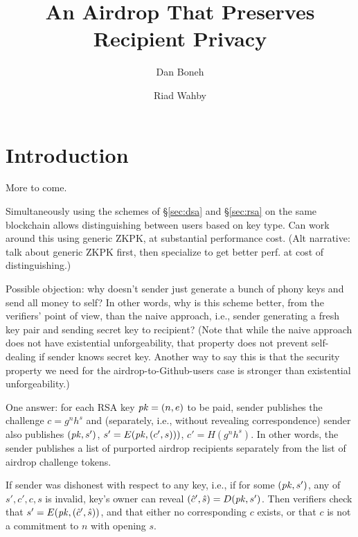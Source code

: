 \documentclass[11pt]{article}
\begin{document}
\title{An Airdrop That Preserves Recipient Privacy}
\author{Dan Boneh \and Riad Wahby}

\maketitle

\begin{abstract}
\end{abstract}

\section{Introduction}

More to come.

Simultaneously using the schemes of \S\ref{sec:dsa} and \S\ref{sec:rsa}
    on the same blockchain allows distinguishing between users based on
    key type.
Can work around this using generic ZKPK, at substantial performance cost.
(Alt narrative: talk about generic ZKPK first, then specialize to get better
    perf. at cost of distinguishing.)

Possible objection: why doesn't sender just generate a bunch of phony keys
    and send all money to self?
In other words, why is this scheme better, from the verifiers' point of view,
    than the naive approach, i.e., sender generating a fresh key pair and
    sending secret key to recipient?
(Note that while the naive approach does not have existential unforgeability,
    that property does not prevent self-dealing if sender knows secret key.
Another way to say this is that the security property we need for the
    airdrop-to-Github-users case is stronger than existential unforgeability.)

One answer: for each RSA key $\mathit{pk} = (n, e)$ to be paid, sender publishes
    the challenge $c = g^nh^s$ and (separately, i.e., without revealing
    correspondence) sender also publishes
$(\mathit{pk}, s')$, $s' = E(\mathit{pk}, (c',s)))$, $c' = H(g^nh^s)$.
In other words, the sender publishes a list of purported airdrop recipients
    separately from the list of airdrop challenge tokens.

If sender was dishonest with respect to any key, i.e., if for some $(\mathit{pk},
    s')$, any of $s', c', c, s$ is invalid, key's owner can reveal $(\hat{c}',
    \hat{s}) = D(\mathit{pk}, s')$.
Then verifiers check that $s' = E(\mathit{pk}, (\hat{c}', \hat{s}))$, and that
    either no corresponding $c$ exists, or that $c$ is not a commitment
    to $n$ with opening $s$.
\end{document}
